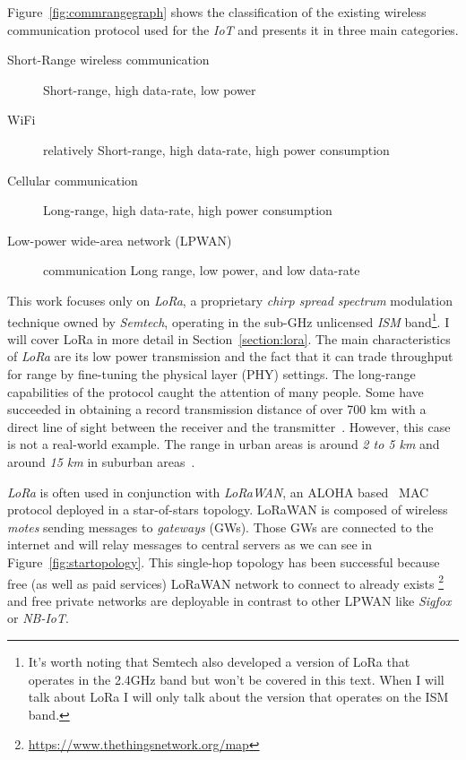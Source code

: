 Figure~\ref{fig:commrangegraph} shows the classification
of the existing wireless communication protocol used for the \emph{IoT} and
presents it in three main categories.

\begin{description}
    \item[Short-Range wireless communication] Short-range, high
        data-rate, low power
    \item[WiFi] relatively Short-range, high
        data-rate, high power consumption
    \item[Cellular communication] Long-range, high data-rate, high power
        consumption
    \item[Low-power wide-area network (LPWAN)] communication Long range,
        low power, and low data-rate
\end{description}



This work focuses only on \emph{LoRa}, a proprietary \emph{chirp spread spectrum}
modulation technique owned by \emph{Semtech}, operating in the sub-GHz
unlicensed \emph{ISM} band\footnote{It's worth noting that Semtech also developed a version of LoRa that
operates in the 2.4GHz band but won't be covered in this text. When I will talk
about LoRa I will only talk about the version that operates on the ISM band.}. 
I will cover LoRa in more detail in Section~\ref{section:lora}.
The main characteristics of \emph{LoRa} are its low power transmission and the
fact that it can trade throughput for range by fine-tuning the physical layer
(PHY) settings.
The long-range capabilities of the protocol caught the attention of
many people. 
Some have succeeded in obtaining a record transmission distance of over 700 km with
a direct line of sight between the receiver and the
transmitter~\cite{network_2017}.
However, this case is not a real-world example. The range in urban areas is
around \emph{2 to 5 km} and around \emph{15 km} in suburban
areas~\cite{8030482}.

\emph{LoRa} is often used in conjunction with \emph{LoRaWAN}, an ALOHA 
based~\cite{loraalliance:lorawanspecification} MAC protocol deployed in a star-of-stars 
topology.
LoRaWAN is composed of wireless \emph{motes} sending messages to \emph{gateways} (GWs).
Those GWs are connected to the internet and will relay messages to central servers
as we can see in Figure~\ref{fig:startopology}.
This single-hop topology has been successful because free (as well as paid
services) LoRaWAN network to connect to already exists
\footnote{\url{https://www.thethingsnetwork.org/map}} and free private networks are
deployable in contrast to other LPWAN like \emph{Sigfox} or \emph{NB-IoT}.

